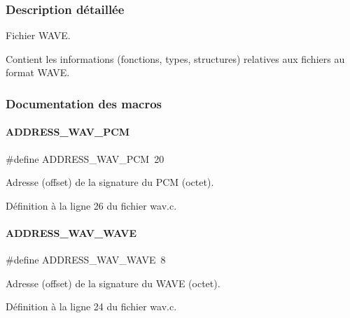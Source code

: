 \subsubsection{Description détaillée}
Fichier W\+A\+VE. 

Contient les informations (fonctions, types, structures) relatives aux fichiers au format W\+A\+VE. 

\subsubsection{Documentation des macros}
\mbox{\label{a00101_afe2f42e330c81f6120793f879dfc3db2}} 
\paragraph{\texorpdfstring{A\+D\+D\+R\+E\+S\+S\+\_\+\+W\+A\+V\+\_\+\+P\+CM}{ADDRESS\_WAV\_PCM}}
{\footnotesize\ttfamily \#define A\+D\+D\+R\+E\+S\+S\+\_\+\+W\+A\+V\+\_\+\+P\+CM~20}

Adresse (offset) de la signature du P\+CM (octet). 

Définition à la ligne 26 du fichier wav.\+c.

\mbox{\label{a00101_a24886987cca2e0485e1ef755174b9a92}} 
\paragraph{\texorpdfstring{A\+D\+D\+R\+E\+S\+S\+\_\+\+W\+A\+V\+\_\+\+W\+A\+VE}{ADDRESS\_WAV\_WAVE}}
{\footnotesize\ttfamily \#define A\+D\+D\+R\+E\+S\+S\+\_\+\+W\+A\+V\+\_\+\+W\+A\+VE~8}

Adresse (offset) de la signature du W\+A\+VE (octet). 

Définition à la ligne 24 du fichier wav.\+c.

\mbox{\label{a00101_a0f8eb8609d0718183aacd6ed326a927f}} 
